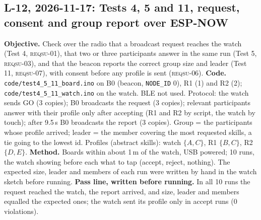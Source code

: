 \IfFileExists{IEEEtran.cls}{\documentclass[conference]{IEEEtran}}{\documentclass[10pt,twocolumn]{article}}
\newcommand{\req}[1]{\textsc{reqsu-}#1}
\begin{document}
\subsection*{L-12, 2026-11-17: Tests 4, 5 and 11, request, consent and group report over ESP-NOW}
\textbf{Objective.} Check over the radio that a broadcast request reaches the watch (Test 4, \req{01}), that two or three participants answer in the same run (Test 5, \req{03}), and that the beacon reports the correct group size and leader (Test 11, \req{07}), with consent before any profile is sent (\req{06}). \textbf{Code.} \texttt{code/test4\_5\_11\_board.ino} on B0 (beacon, \texttt{NODE\_ID} 0), R1 (1) and R2 (2); \texttt{code/test4\_5\_11\_watch.ino} on the watch. BLE not used. Protocol: the watch sends GO (3 copies); B0 broadcasts the request (3 copies); relevant participants answer with their profile only after accepting (R1 and R2 by script, the watch by touch); after 9.5\,s B0 broadcasts the report (3 copies). Group = the participants whose profile arrived; leader = the member covering the most requested skills, a tie going to the lowest id. Profiles (abstract skills): watch $\{A,C\}$, R1 $\{B,C\}$, R2 $\{D,E\}$. \textbf{Method.} Boards within about 1\,m of the watch, USB powered; 10 runs, the watch showing before each what to tap (accept, reject, nothing). The expected size, leader and members of each run were written by hand in the watch sketch before running. \textbf{Pass line, written before running.} In all 10 runs the request reached the watch, the report arrived, and size, leader and members equalled the expected ones; the watch sent its profile only in accept runs (0 violations).
\end{document}
